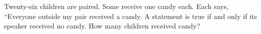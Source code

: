 Twenty-six children are paired. Some receive one candy each. Each says, ``Everyone outside my pair received a candy. A statement is true if and only if its speaker received no candy. How many children received candy?
